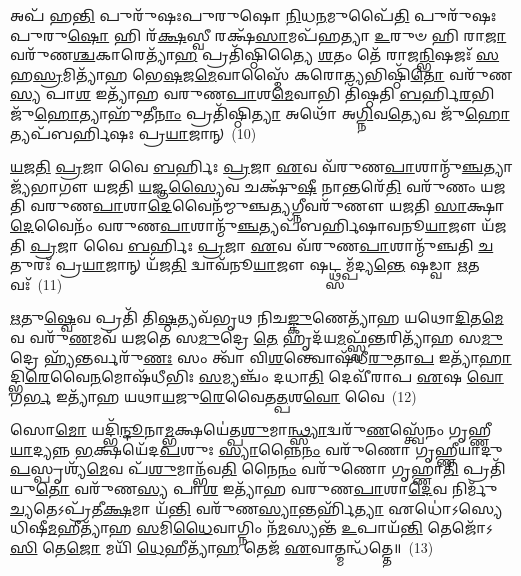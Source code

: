 𑌅𑌪᳴ 𑌹\-\ul{𑌨𑍍𑌤𑌿} 𑌪𑍁𑌰𑍁᳴𑌷𑌃𑌪𑍁𑌰𑍁𑌷𑍋 \ul{𑌨𑌿}\-𑌧\-\ul{𑌨}\-𑌮𑍁𑌪𑍈᳴\-\ul{𑌤𑌿} 𑌪𑍁𑌰𑍁᳴𑌷𑌃𑌪𑍁𑌰𑍁\-\ul{𑌷𑍋} 𑌹𑌿 𑌰᳴\-\ul{𑌕𑍍𑌷}\-𑌸𑍍𑌵𑍀 𑌰𑌕𑍍𑌷᳴\-\ul{𑌸𑌾}\-𑌮𑌪᳴𑌹𑌤𑍍𑌯𑌾 \ul{𑌉}\-𑌰𑍁𑍞 𑌹𑌿 𑌰𑌾\-\ul{𑌜𑌾} 𑌵𑌰𑍁᳴𑌣\-\ul{𑌶𑍍𑌚}\-𑌕𑌾𑌰𑍇𑌤𑍍𑌯𑌾᳴\-\ul{𑌹} 𑌪𑍍𑌰𑌤𑌿᳴𑌷𑍍𑌠𑌿𑌤𑍍𑌯𑍈 \ul{𑌶}\-𑌤𑌂 𑌤𑍇᳴ 𑌰𑌾𑌜\-\ul{𑌨𑍍𑌭𑌿}\-𑌷𑌜𑌃᳴ \ul{𑌸}\-𑌹\-\ul{𑌸𑍍𑌰}\-𑌮𑌿𑌤𑍍𑌯𑌾᳴𑌹 𑌭𑍇\-\ul{𑌷}\-𑌜\-\ul{𑌮𑍇}\-𑌵𑌾𑌸𑍍𑌮𑍈᳴ 𑌕𑌰𑍋\-\ul{𑌤𑍍𑌯}\-𑌭𑌿𑌷𑍍𑌠𑌿᳴\-\ul{𑌤𑍋} 𑌵𑌰𑍁᳴𑌣\-\ul{𑌸𑍍𑌯} 𑌪𑌾\-\ul{𑌶} 𑌇𑌤𑍍𑌯𑌾᳴𑌹 𑌵𑌰𑍁𑌣\-\ul{𑌪𑌾}\-𑌶\-\ul{𑌮𑍇}\-𑌵𑌾𑌭𑌿 𑌤𑌿᳴𑌷𑍍𑌠𑌤𑌿 \ul{𑌬}\-𑌰𑍍\mbox{}𑌹𑌿\-\ul{𑌰}\-𑌭𑌿 𑌜𑍁᳴\-\ul{𑌹𑍋}\-𑌤𑍍𑌯𑌾𑌹𑍁᳴𑌤𑍀\-\ul{𑌨𑌾𑌂} 𑌪𑍍𑌰𑌤𑌿᳴𑌷𑍍𑌠𑌿\-\ul{𑌤𑍍𑌯𑌾} 𑌅𑌥𑍋᳴ 𑌅\-\ul{𑌗𑍍𑌨𑌿}\-𑌵\-\ul{𑌤𑍍𑌯𑍇}\-𑌵 𑌜𑍁᳴\-\ul{𑌹𑍋}\-𑌤𑍍𑌯𑌪᳴𑌬𑌰𑍍\mbox{}𑌹𑌿𑌷𑌃 𑌪𑍍𑌰\-\ul{𑌯𑌾}\-𑌜𑌾𑌨𑍍~(10)

\-\ul{𑌯}\-\-\ul{𑌜}\-\-\ul{𑌤𑌿} \ul{𑌪𑍍𑌰}\-𑌜𑌾 𑌵𑍈 \ul{𑌬}\-𑌰𑍍\mbox{}𑌹𑌿𑌃 \ul{𑌪𑍍𑌰}\-𑌜𑌾 \ul{𑌏}\-𑌵 𑌵᳴𑌰𑍁𑌣\-\ul{𑌪𑌾}\-𑌶𑌾𑌨𑍍𑌮𑍁᳴\-\ul{𑌞𑍍𑌚}\-𑌤𑍍𑌯𑌾𑌜𑍍𑌯᳴𑌭𑌾𑌗𑍗 𑌯𑌜𑌤𑌿 \ul{𑌯}\-𑌜𑍍𑌞\-\ul{𑌸𑍍𑌯𑍈}\-𑌵 𑌚𑌕𑍍𑌷𑍁᳴\-\ul{𑌷𑍀} 𑌨𑌾𑌨𑍍𑌤𑌰𑍇᳴\-\ul{𑌤𑌿} 𑌵𑌰𑍁᳴𑌣𑌂 𑌯𑌜𑌤𑌿 𑌵𑌰𑍁𑌣\-\ul{𑌪𑌾}\-𑌶𑌾\-\ul{𑌦𑍇}\-𑌵𑍈𑌨᳴𑌮𑍍𑌮𑍁𑌞𑍍𑌚\-\ul{𑌤𑍍𑌯}\-𑌗𑍍𑌨𑍀𑌵𑌰𑍁᳴𑌣𑍗 𑌯𑌜𑌤𑌿 \ul{𑌸𑌾}\-𑌕𑍍𑌷𑌾\-\ul{𑌦𑍇}\-𑌵𑍈𑌨𑌂᳴ 𑌵𑌰𑍁𑌣\-\ul{𑌪𑌾}\-𑌶𑌾𑌨𑍍𑌮𑍁᳴\-\ul{𑌞𑍍𑌚}\-𑌤𑍍𑌯𑌪᳴𑌬𑌰𑍍\mbox{}𑌹𑌿𑌷𑌾𑌵𑌨𑍂\-\ul{𑌯𑌾}\-𑌜𑍗 𑌯᳴𑌜𑌤𑌿 \ul{𑌪𑍍𑌰}\-𑌜𑌾 𑌵𑍈 \ul{𑌬}\-𑌰𑍍\mbox{}𑌹𑌿𑌃 \ul{𑌪𑍍𑌰}\-𑌜𑌾 \ul{𑌏}\-𑌵 𑌵᳴𑌰𑍁𑌣\-\ul{𑌪𑌾}\-𑌶𑌾𑌨𑍍𑌮𑍁᳴𑌞𑍍𑌚𑌤𑌿 \ul{𑌚}\-𑌤𑍁𑌰𑌃᳴ 𑌪𑍍𑌰\-\ul{𑌯𑌾}\-𑌜𑌾𑌨𑍍 𑌯᳴𑌜\-\ul{𑌤𑌿} 𑌦𑍍𑌵𑌾𑌵᳴𑌨𑍂\-\ul{𑌯𑌾}\-𑌜𑍗 𑌷𑌟𑍍𑌥𑍍𑌸𑌮𑍍𑌪᳴𑌦𑍍𑌯\-\ul{𑌨𑍍𑌤𑍇} 𑌷𑌡𑍍𑌵𑌾 \ul{𑌋}\-𑌤𑌵𑌃᳴~(11)

\-\ul{𑌋}\-𑌤𑍁\-\ul{𑌷𑍍𑌵𑍇}\-𑌵 𑌪𑍍𑌰𑌤𑌿᳴ 𑌤𑌿\-\ul{𑌷𑍍𑌠}\-𑌤𑍍𑌯𑌵᳴𑌭𑍃𑌥 𑌨𑌿𑌚\-\ul{𑌙𑍍𑌕𑍁}\-𑌣𑍇𑌤𑍍𑌯𑌾᳴𑌹 𑌯𑌥𑍋\-\ul{𑌦𑌿}\-𑌤\-\ul{𑌮𑍇}\-𑌵 𑌵𑌰𑍁᳴\-\ul{𑌣}\-𑌮𑌵᳴ 𑌯𑌜𑌤𑍇 𑌸\-\ul{𑌮𑍁}\-𑌦𑍍𑌰𑍇 \ul{𑌤𑍇} 𑌹𑍃𑌦᳴𑌯\-\ul{𑌮}\-𑌫𑍍𑌸𑍍𑌵᳴𑌨𑍍𑌤𑌰𑌿𑌤𑍍𑌯𑌾᳴𑌹 𑌸\-\ul{𑌮𑍁}\-𑌦𑍍𑌰𑍇 𑌹𑍍𑌯᳴𑌨𑍍𑌤𑌰𑍍𑌵𑌰𑍁᳴\-\ul{𑌣𑌃} 𑌸𑌂 𑌤𑍍𑌵𑌾᳴ 𑌵𑌿\-\ul{𑌶}\-𑌨𑍍𑌤𑍍𑌵𑍋𑌷᳴𑌧𑍀\-\ul{𑌰𑍁}\-𑌤𑌾\-\ul{𑌪} 𑌇𑌤𑍍𑌯𑌾᳴\-\ul{𑌹𑌾}\-𑌦𑍍𑌭𑌿\-\ul{𑌰𑍇}\-𑌵𑍈\-\ul{𑌨}\-𑌮𑍋𑌷᳴𑌧𑍀𑌭𑌿𑌃 \ul{𑌸}\-𑌮𑍍𑌯𑌞𑍍𑌚𑌂᳴ 𑌦𑌧𑌾\-\ul{𑌤𑌿} 𑌦𑍇𑌵𑍀᳴𑌰𑌾𑌪 \ul{𑌏}\-𑌷 \ul{𑌵𑍋} 𑌗\-\ul{𑌰𑍍𑌭} 𑌇𑌤𑍍𑌯𑌾᳴𑌹 𑌯𑌥𑌾\-\ul{𑌯}\-𑌜𑍁\-\ul{𑌰𑍇}\-𑌵𑍈𑌤\-\ul{𑌤𑍍𑌪}\-𑌶\-\ul{𑌵𑍋} 𑌵𑍈~(12)

𑌸𑍋\-\ul{𑌮𑍋} 𑌯𑌦𑍍𑌭𑌿᳴\-\ul{𑌨𑍍𑌦𑍂}\-𑌨𑌾\-\ul{𑌮𑍍𑌭}\-𑌕𑍍𑌷𑌯𑍇॑𑌤𑍍𑌪\-\ul{𑌶𑍁}\-𑌮𑌾\-\ul{𑌨𑍍𑌥𑍍𑌸𑍍𑌯𑌾}\-𑌦𑍍𑌵𑌰𑍁᳴\-\ul{𑌣}\-𑌸𑍍𑌤𑍍𑌵𑍇᳴𑌨𑌂 𑌗𑍃𑌹𑍍𑌣𑍀\-\ul{𑌯𑌾}\-𑌦𑍍𑌯𑌨𑍍𑌨 \ul{𑌭}\-𑌕𑍍𑌷𑌯𑍇᳴𑌦\-\ul{𑌪}\-𑌶𑍁𑌃 \ul{𑌸𑍍𑌯𑌾}\-𑌨𑍍𑌨𑍈\-\ul{𑌨𑌂} 𑌵𑌰𑍁᳴𑌣𑍋 𑌗𑍃𑌹𑍍𑌣𑍀𑌯𑌾𑌦𑍁\-\ul{𑌪}\-𑌸𑍍𑌪𑍃𑌶𑍍𑌯᳴\-\ul{𑌮𑍇}\-𑌵 𑌪᳴\-\ul{𑌶𑍁}\-𑌮𑌾𑌨𑍍𑌭᳴𑌵\-\ul{𑌤𑌿} 𑌨𑍈\-\ul{𑌨𑌂} 𑌵𑌰𑍁᳴𑌣𑍋 𑌗𑍃𑌹𑍍𑌣𑌾\-\ul{𑌤𑌿} 𑌪𑍍𑌰𑌤𑌿᳴𑌯𑍁\-\ul{𑌤𑍋} 𑌵𑌰𑍁᳴𑌣\-\ul{𑌸𑍍𑌯} 𑌪𑌾\-\ul{𑌶} 𑌇𑌤𑍍𑌯𑌾᳴𑌹 𑌵𑌰𑍁𑌣\-\ul{𑌪𑌾}\-𑌶𑌾\-\ul{𑌦𑍇}\-𑌵 𑌨𑌿𑌰𑍍𑌮𑍁᳴\-\ul{𑌚𑍍𑌯}\-𑌤𑍇\-𑌽𑌪𑍍𑌰᳴𑌤𑍀\-\ul{𑌕𑍍𑌷}\-𑌮𑌾 𑌯᳴\-\ul{𑌨𑍍𑌤𑌿} 𑌵𑌰𑍁᳴𑌣\-\ul{𑌸𑍍𑌯𑌾}\-𑌨𑍍𑌤𑌰𑍍\mbox{}𑌹𑌿᳴\-\ul{𑌤𑍍𑌯𑌾} 𑌏𑌧𑍋॑\-𑌽𑌸𑍍𑌯𑍇𑌧𑌿𑌷𑍀\-\ul{𑌮}\-𑌹𑍀𑌤𑍍𑌯𑌾᳴𑌹 \ul{𑌸}\-𑌮𑌿\-\ul{𑌧𑍈}\-𑌵𑌾𑌗𑍍𑌨𑌿𑌂 𑌨᳴\-\ul{𑌮}\-𑌸𑍍𑌯𑌨𑍍𑌤᳴ \ul{𑌉}\-𑌪𑌾𑌯᳴\-\ul{𑌨𑍍𑌤𑌿} 𑌤𑍇𑌜𑍋᳴\-𑌽\-\ul{𑌸𑌿} 𑌤𑍇\-\ul{𑌜𑍋} 𑌮𑌯𑌿᳴ \ul{𑌧𑍇}\-𑌹𑍀𑌤𑍍𑌯𑌾᳴\-\ul{𑌹} 𑌤𑍇𑌜᳴ \ul{𑌏}\-𑌵𑌾𑌤𑍍𑌮𑌨𑍍𑌧᳴𑌤𑍍𑌤𑍇॥~(13)

{\anuvakamend[{𑌰𑌕𑍍𑌷𑌾𑍞᳴𑌸𑌿 𑌪𑍍𑌰\-\ul{𑌯𑌾}\-𑌜𑌾\-\ul{𑌨𑍃}\-𑌤\-\ul{𑌵𑍋} 𑌵𑍈 𑌨᳴\-\ul{𑌮}\-𑌸𑍍𑌯\-\ul{𑌨𑍍𑌤𑍋} 𑌦𑍍𑌵𑌾𑌦᳴𑌶 𑌚}]}%

